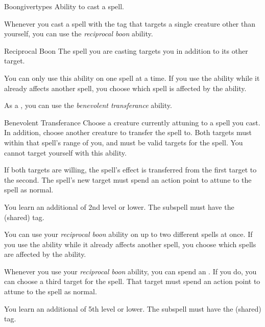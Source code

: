     \begin{feat}{Boongiver}{types}
        \featpre Ability to cast a spell.

         Whenever you cast a spell with the  tag that targets a single creature other than yourself, you can use the \textit{reciprocal boon} ability.
        \begin{ability}{Reciprocal Boon}
            The spell you are casting targets you in addition to its other target.

            You can only use this ability on one spell at a time.
            If you use the ability while it already affects another spell, you choose which spell is affected by the ability.
        \end{ability}

         As a , you can use the \textit{benevolent transferance} ability.
        \begin{ability}{Benevolent Transferance}
            Choose a creature currently attuning to a spell you cast.
            In addition, choose another creature to transfer the spell to.
            Both targets must within that spell's range of you, and must be valid targets for the spell.
            You cannot target yourself with this ability.

            If both targets are willing, the spell's effect is transferred from the first target to the second.
            The spell's new target must spend an action point to attune to the spell as normal.
        \end{ability}

         You learn an additional  of 2nd level or lower.
        The subspell must have the  (shared) tag.

         You can use your \textit{reciprocal boon} ability on up to two different spells at once.
        If you use the ability while it already affects another spell, you choose which spells are affected by the ability.

         Whenever you use your \textit{reciprocal boon} ability, you can spend an .
        If you do, you can choose a third target for the spell.
        That target must spend an action point to attune to the spell as normal.

         You learn an additional  of 5th level or lower.
        The subspell must have the  (shared) tag.


\end{feat}
